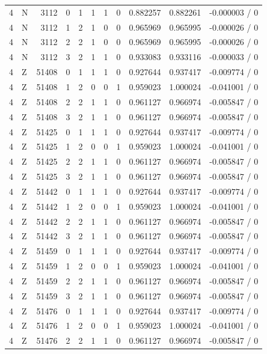 \begin{longtable}{@{}rlrrlrrrrrr@{}}
4 & N & 3112 & 0 & 1 & 1 & 1 & 0 & 0.882257 & 0.882261 & -0.000003 / 0 \\
4 & N & 3112 & 1 & 2 & 1 & 0 & 0 & 0.965969 & 0.965995 & -0.000026 / 0 \\
4 & N & 3112 & 2 & 2 & 1 & 0 & 0 & 0.965969 & 0.965995 & -0.000026 / 0 \\
4 & N & 3112 & 3 & 2 & 1 & 1 & 0 & 0.933083 & 0.933116 & -0.000033 / 0 \\
4 & Z & 51408 & 0 & 1 & 1 & 1 & 0 & 0.927644 & 0.937417 & -0.009774 / 0 \\
4 & Z & 51408 & 1 & 2 & 0 & 0 & 1 & 0.959023 & 1.000024 & -0.041001 / 0 \\
4 & Z & 51408 & 2 & 2 & 1 & 1 & 0 & 0.961127 & 0.966974 & -0.005847 / 0 \\
4 & Z & 51408 & 3 & 2 & 1 & 1 & 0 & 0.961127 & 0.966974 & -0.005847 / 0 \\
4 & Z & 51425 & 0 & 1 & 1 & 1 & 0 & 0.927644 & 0.937417 & -0.009774 / 0 \\
4 & Z & 51425 & 1 & 2 & 0 & 0 & 1 & 0.959023 & 1.000024 & -0.041001 / 0 \\
4 & Z & 51425 & 2 & 2 & 1 & 1 & 0 & 0.961127 & 0.966974 & -0.005847 / 0 \\
4 & Z & 51425 & 3 & 2 & 1 & 1 & 0 & 0.961127 & 0.966974 & -0.005847 / 0 \\
4 & Z & 51442 & 0 & 1 & 1 & 1 & 0 & 0.927644 & 0.937417 & -0.009774 / 0 \\
4 & Z & 51442 & 1 & 2 & 0 & 0 & 1 & 0.959023 & 1.000024 & -0.041001 / 0 \\
4 & Z & 51442 & 2 & 2 & 1 & 1 & 0 & 0.961127 & 0.966974 & -0.005847 / 0 \\
4 & Z & 51442 & 3 & 2 & 1 & 1 & 0 & 0.961127 & 0.966974 & -0.005847 / 0 \\
4 & Z & 51459 & 0 & 1 & 1 & 1 & 0 & 0.927644 & 0.937417 & -0.009774 / 0 \\
4 & Z & 51459 & 1 & 2 & 0 & 0 & 1 & 0.959023 & 1.000024 & -0.041001 / 0 \\
4 & Z & 51459 & 2 & 2 & 1 & 1 & 0 & 0.961127 & 0.966974 & -0.005847 / 0 \\
4 & Z & 51459 & 3 & 2 & 1 & 1 & 0 & 0.961127 & 0.966974 & -0.005847 / 0 \\
4 & Z & 51476 & 0 & 1 & 1 & 1 & 0 & 0.927644 & 0.937417 & -0.009774 / 0 \\
4 & Z & 51476 & 1 & 2 & 0 & 0 & 1 & 0.959023 & 1.000024 & -0.041001 / 0 \\
4 & Z & 51476 & 2 & 2 & 1 & 1 & 0 & 0.961127 & 0.966974 & -0.005847 / 0 \\

\end{longtable}

